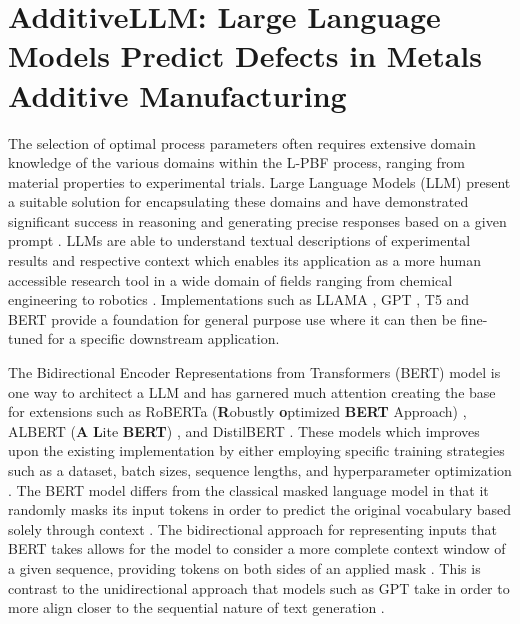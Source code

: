 \chapter{
    AdditiveLLM: Large Language Models Predict Defects in Metals Additive
    Manufacturing
}
\label{chapter:additivellm}

The selection of optimal process parameters often requires extensive domain
knowledge of the various domains within the L-PBF process, ranging from material
properties to experimental trials. Large Language Models (LLM) present a
suitable solution for encapsulating these domains and have demonstrated
significant success in reasoning and generating precise responses based on a
given prompt \cite{touvron_llama_2023, minaee_large_2024, devlin_bert_2019,
brown_language_2020, liu_roberta_2019}. LLMs are able to understand textual
descriptions of experimental results and respective context which enables its
application as a more human accessible research tool in a wide domain of fields
ranging from chemical engineering to robotics \cite{jadhav_llm-3d_2025,
ock_catalyst_2023, car_plato_2024, lorsung_explain_2024, shah_peptide-gpt_2024,
farimani_large_2024, chandrasekhar_amgpt_2024, ock_multimodal_2024,
balaji_gpt-molberta_2023, ock_adsorb-agent_2026, jadhav_large_2026}.
Implementations such as LLAMA \cite{touvron_llama_2023, grattafiori_llama_2024},
GPT \cite{brown_language_2020}, T5 \cite{raffel_exploring_2023} and BERT
\cite{devlin_bert_2019} provide a foundation for general purpose use where it
can then be fine-tuned for a specific downstream application.

The Bidirectional Encoder Representations from Transformers (BERT)
\cite{devlin_bert_2019} model is one way to architect a LLM and has garnered
much attention creating the base for extensions such as RoBERTa
(\textbf{R}obustly \textbf{o}ptimized \textbf{BERT} Approach)
\cite{liu_roberta_2019}, ALBERT (\textbf{A} \textbf{L}ite \textbf{BERT})
\cite{lan_albert_2020}, and DistilBERT \cite{sanh_distilbert_2020}. These models
which improves upon the existing implementation by either employing specific
training strategies such as a dataset, batch sizes, sequence lengths, and
hyperparameter optimization \cite{liu_roberta_2019, lan_albert_2020,
sanh_distilbert_2020}. The BERT model differs from the classical masked language
model in that it randomly masks its input tokens in order to predict the
original vocabulary based solely through context \cite{devlin_bert_2019}. The
bidirectional approach for representing inputs that BERT takes allows for the
model to consider a more complete context window of a given sequence, providing
tokens on both sides of an applied mask \cite{devlin_bert_2019}. This is
contrast to the unidirectional approach that models such as GPT take in order to
more align closer to the sequential nature of text generation
\cite{radford_improving_2018}.


